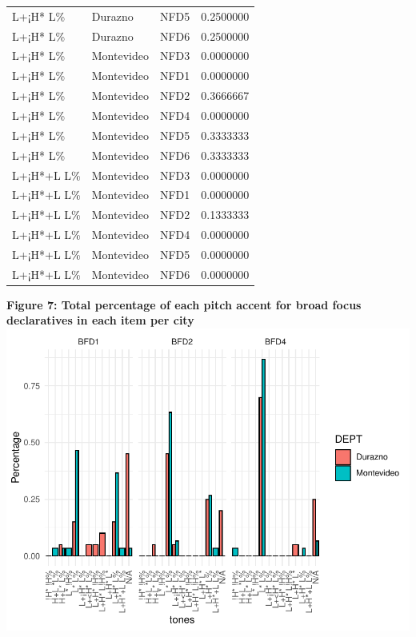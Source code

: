 \documentclass[
  man]{apa6}
\begin{document}
\begin{longtable}[]{@{}lllr@{}}
L+¡H* L\% & Durazno & NFD5 & 0.2500000 \\
L+¡H* L\% & Durazno & NFD6 & 0.2500000 \\
L+¡H* L\% & Montevideo & NFD3 & 0.0000000 \\
L+¡H* L\% & Montevideo & NFD1 & 0.0000000 \\
L+¡H* L\% & Montevideo & NFD2 & 0.3666667 \\
L+¡H* L\% & Montevideo & NFD4 & 0.0000000 \\
L+¡H* L\% & Montevideo & NFD5 & 0.3333333 \\
L+¡H* L\% & Montevideo & NFD6 & 0.3333333 \\
L+¡H*+L L\% & Montevideo & NFD3 & 0.0000000 \\
L+¡H*+L L\% & Montevideo & NFD1 & 0.0000000 \\
L+¡H*+L L\% & Montevideo & NFD2 & 0.1333333 \\
L+¡H*+L L\% & Montevideo & NFD4 & 0.0000000 \\
L+¡H*+L L\% & Montevideo & NFD5 & 0.0000000 \\
L+¡H*+L L\% & Montevideo & NFD6 & 0.0000000 \\
\end{longtable}

\textbf{Figure 7: Total percentage of each pitch accent for broad focus declaratives in each item per city}
\includegraphics{main_files/figure-latex/unnamed-chunk-16-1.pdf}
\end{document}
